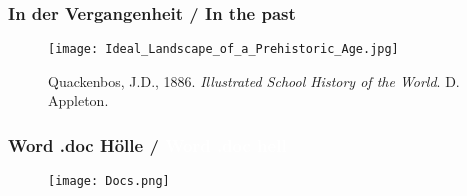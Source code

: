 \documentclass[13pt]{beamer}
\begin{document}
%
%

\begin{frame}
  \frametitle{In der Vergangenheit / \textcolor{mfn_green}{In the past}}
  \begin{figure}
    \texttt{[image: Ideal\_Landscape\_of\_a\_Prehistoric\_Age.jpg]}
    \caption{Quackenbos, J.D., 1886. \textit{Illustrated School History of the World}. D. Appleton.}
  \end{figure}
\end{frame}

{
\begin{frame}
  \frametitle{Word\textsuperscript{\tiny\textregistered} .doc Hölle /
    \textcolor{white}{Word\textsuperscript{\tiny\textregistered} .doc hell}}
  \begin{figure}
  \texttt{[image: Docs.png]}
  \end{figure}
\end{frame}
}
\end{document}
